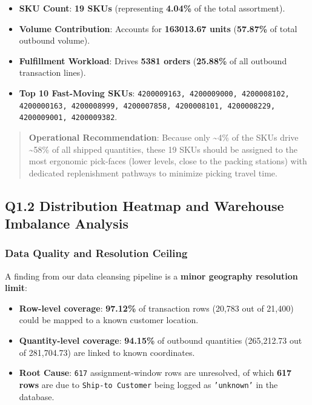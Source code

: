 \documentclass[11pt]{article}
\begin{document}
\begin{itemize}
\begin{itemize}
\item \textbf{SKU Count}: \textbf{19 SKUs} (representing \textbf{4.04\%} of the total assortment).
\item \textbf{Volume Contribution}: Accounts for \textbf{163013.67 units} (\textbf{57.87\%} of total outbound volume).
\item \textbf{Fulfillment Workload}: Drives \textbf{5381 orders} (\textbf{25.88\%} of all outbound transaction lines).
\item \textbf{Top 10 Fast-Moving SKUs}: \texttt{4200009163, 4200009000, 4200008102, 4200000163, 4200008999, 4200007858, 4200008101, 4200008229, 4200009001, 4200009382}.
\end{itemize}

\begin{quote}
\textbf{Operational Recommendation}: Because only \textasciitilde4\% of the SKUs drive \textasciitilde58\% of all shipped quantities, these 19 SKUs should be assigned to the most ergonomic pick-faces (lower levels, close to the packing stations) with dedicated replenishment pathways to minimize picking travel time.
\end{quote}

\subsection{Q1.2 Distribution Heatmap and Warehouse Imbalance Analysis}\label{q1.2-distribution-heatmap-and-warehouse-imbalance-analysis}

\subsubsection{Data Quality and Resolution Ceiling}\label{data-quality-and-resolution-ceiling}

A finding from our data cleansing pipeline is a \textbf{minor geography resolution limit}:
\begin{itemize}
\item \textbf{Row-level coverage}: \textbf{97.12\%} of transaction rows (20,783 out of 21,400) could be mapped to a known customer location.
\item \textbf{Quantity-level coverage}: \textbf{94.15\%} of outbound quantities (265,212.73 out of 281,704.73) are linked to known coordinates.
\item \textbf{Root Cause}: \texttt{617} assignment-window rows are unresolved, of which \textbf{617 rows} are due to \texttt{Ship-to Customer} being logged as \texttt{'unknown'} in the database.
\end{itemize}


\end{itemize}
\end{document}
